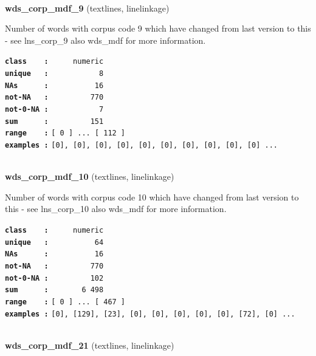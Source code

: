 \documentclass[]{article}
\begin{document}
~

\textbf{wds\_corp\_mdf\_9} (textlines, linelinkage)

Number of words with corpus code 9 which have changed from last version
to this - see lns\_corp\_9 also wds\_mdf for more information.

\textbf{\texttt{class\ \ \ \ :}} \texttt{~~~~~numeric}\\
\textbf{\texttt{unique\ \ \ :}} \texttt{~~~~~~~~~~~8}\\
\textbf{\texttt{NAs\ \ \ \ \ \ :}} \texttt{~~~~~~~~~~16}\\
\textbf{\texttt{not-NA\ \ \ :}} \texttt{~~~~~~~~~770}\\
\textbf{\texttt{not-0-NA\ :}} \texttt{~~~~~~~~~~~7}\\
\textbf{\texttt{sum\ \ \ \ \ \ :}} \texttt{~~~~~~~~~151}\\
\textbf{\texttt{range\ \ \ \ :}}
\texttt{{[}\ 0\ {]}\ ...\ {[}\ 112\ {]}}\\
\textbf{\texttt{examples\ :}}
\texttt{{[}0{]},\ {[}0{]},\ {[}0{]},\ {[}0{]},\ {[}0{]},\ {[}0{]},\ {[}0{]},\ {[}0{]},\ {[}0{]},\ {[}0{]}\ ...}\\

~

\textbf{wds\_corp\_mdf\_10} (textlines, linelinkage)

Number of words with corpus code 10 which have changed from last version
to this - see lns\_corp\_10 also wds\_mdf for more information.

\textbf{\texttt{class\ \ \ \ :}} \texttt{~~~~~numeric}\\
\textbf{\texttt{unique\ \ \ :}} \texttt{~~~~~~~~~~64}\\
\textbf{\texttt{NAs\ \ \ \ \ \ :}} \texttt{~~~~~~~~~~16}\\
\textbf{\texttt{not-NA\ \ \ :}} \texttt{~~~~~~~~~770}\\
\textbf{\texttt{not-0-NA\ :}} \texttt{~~~~~~~~~102}\\
\textbf{\texttt{sum\ \ \ \ \ \ :}} \texttt{~~~~~~~6~498}\\
\textbf{\texttt{range\ \ \ \ :}}
\texttt{{[}\ 0\ {]}\ ...\ {[}\ 467\ {]}}\\
\textbf{\texttt{examples\ :}}
\texttt{{[}0{]},\ {[}129{]},\ {[}23{]},\ {[}0{]},\ {[}0{]},\ {[}0{]},\ {[}0{]},\ {[}0{]},\ {[}72{]},\ {[}0{]}\ ...}\\

~

\textbf{wds\_corp\_mdf\_21} (textlines, linelinkage)
\end{document}
